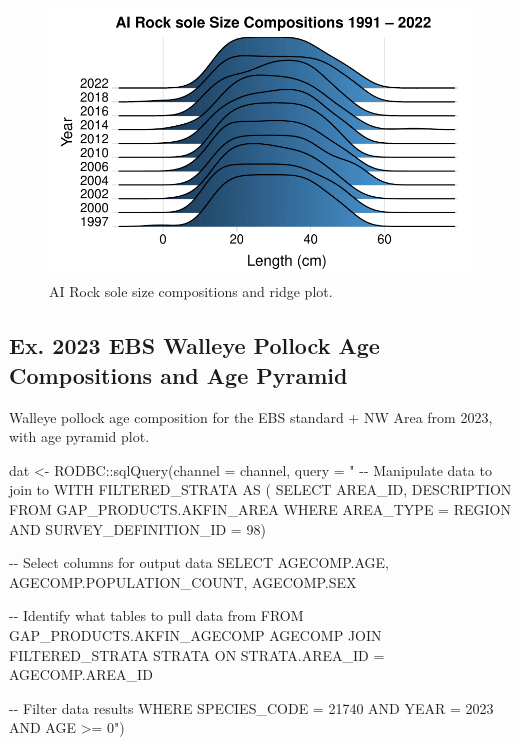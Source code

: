 \documentclass[
  letterpaper,
  oneside,
  open=any]{scrbook}
\newenvironment{Shaded}{\begin{snugshade}}{\end{snugshade}}
\newcommand{\AttributeTok}[1]{\textcolor[rgb]{0.40,0.45,0.13}{#1}}
\newcommand{\FunctionTok}[1]{\textcolor[rgb]{0.28,0.35,0.67}{#1}}
\newcommand{\NormalTok}[1]{\textcolor[rgb]{0.00,0.23,0.31}{#1}}
\newcommand{\OtherTok}[1]{\textcolor[rgb]{0.00,0.23,0.31}{#1}}
\newcommand{\SpecialCharTok}[1]{\textcolor[rgb]{0.37,0.37,0.37}{#1}}
\newcommand{\StringTok}[1]{\textcolor[rgb]{0.13,0.47,0.30}{#1}}
\begin{document}
\begin{figure}[H]

{\centering \includegraphics{content/akfin-oracle-sql-r_files/figure-pdf/test-2-plot-1.pdf}

}

\caption{AI Rock sole size compositions and ridge plot.}

\end{figure}

\hypertarget{ex.-2023-ebs-walleye-pollock-age-compositions-and-age-pyramid}{%
\subsection{Ex. 2023 EBS Walleye Pollock Age Compositions and Age
Pyramid}\label{ex.-2023-ebs-walleye-pollock-age-compositions-and-age-pyramid}}

Walleye pollock age composition for the EBS standard + NW Area from
2023, with age pyramid plot.

\begin{Shaded}
\begin{Highlighting}[]
\NormalTok{dat }\OtherTok{\textless{}{-}}\NormalTok{ RODBC}\SpecialCharTok{::}\FunctionTok{sqlQuery}\NormalTok{(}\AttributeTok{channel =}\NormalTok{ channel, }
                       \AttributeTok{query =} \StringTok{"}
\StringTok{{-}{-} Manipulate data to join to}
\StringTok{WITH FILTERED\_STRATA AS (}
\StringTok{SELECT }
\StringTok{AREA\_ID, }
\StringTok{DESCRIPTION }
\StringTok{FROM GAP\_PRODUCTS.AKFIN\_AREA}
\StringTok{WHERE AREA\_TYPE = \textquotesingle{}REGION\textquotesingle{} AND }
\StringTok{SURVEY\_DEFINITION\_ID = 98)}

\StringTok{{-}{-} Select columns for output data}
\StringTok{SELECT }
\StringTok{AGECOMP.AGE, }
\StringTok{AGECOMP.POPULATION\_COUNT, }
\StringTok{AGECOMP.SEX}

\StringTok{{-}{-} Identify what tables to pull data from}
\StringTok{FROM GAP\_PRODUCTS.AKFIN\_AGECOMP AGECOMP}
\StringTok{JOIN FILTERED\_STRATA STRATA }
\StringTok{ON STRATA.AREA\_ID = AGECOMP.AREA\_ID}

\StringTok{{-}{-} Filter data results}
\StringTok{WHERE SPECIES\_CODE = 21740}
\StringTok{AND YEAR = 2023}
\StringTok{AND AGE \textgreater{}= 0"}\NormalTok{)}
\end{Highlighting}
\end{Shaded}
\end{document}
